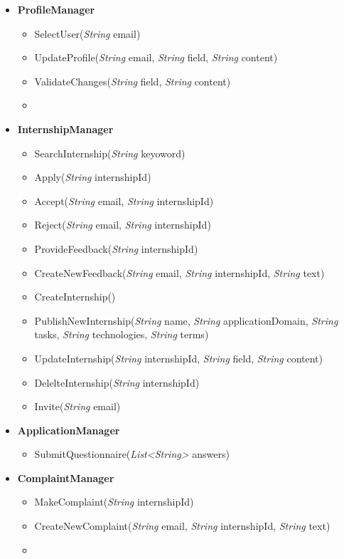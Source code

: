 \begin{itemize}
    \item \textbf{\textbf{ProfileManager}}
\begin{itemize}
        \item SelectUser(\textit{String} email)
        \item UpdateProfile(\textit{String} email, \textit{String} field, \textit{String} content)
        \item ValidateChanges(\textit{String} field, \textit{String} content)
        \item 
\end{itemize}

    \item \textbf{\textbf{InternshipManager}}
\begin{itemize}



    \item SearchInternship(\textit{String} keyoword)
    \item Apply(\textit{String} internshipId)
    \item Accept(\textit{String} email, \textit{String} internshipId)
    \item Reject(\textit{String} email, \textit{String} internshipId)
    \item ProvideFeedback(\textit{String} internshipId)
    \item CreateNewFeedback(\textit{String} email, \textit{String} internshipId, \textit{String} text)
    \item CreateInternship()
    \item PublishNewInternship(\textit{String} name, \textit{String} applicationDomain, \textit{String} tasks, \textit{String} technologies, \textit{String}  terms)
    \item UpdateInternship(\textit{String} internshipId, \textit{String} field, \textit{String} content)
    \item DelelteInternship(\textit{String} internshipId)
    \item Invite(\textit{String} email)
\end{itemize}

    \item \textbf{\textbf{ApplicationManager}}
\begin{itemize}
        \item SubmitQuestionnaire(\textit{List<String>} answers)
\end{itemize}

    \item \textbf{\textbf{ComplaintManager}}
\begin{itemize}
        \item MakeComplaint(\textit{String} internshipId)
        \item CreateNewComplaint(\textit{String} email, \textit{String} internshipId, \textit{String} text)
        \item 
\end{itemize}


\end{itemize}
